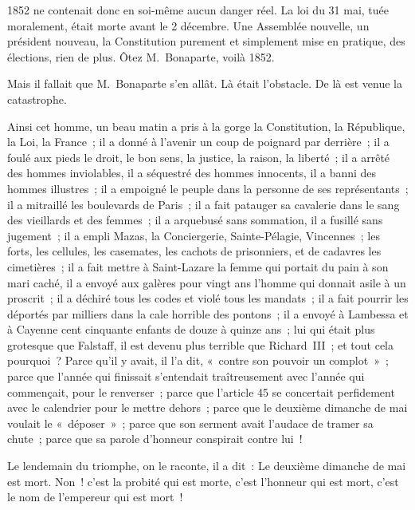 \documentclass[french,twoside]{book} %
\begin{document}
1852 ne contenait donc en soi-même aucun danger réel. La loi du 31 mai, tuée moralement, était morte avant le 2 décembre. Une Assemblée nouvelle, un président nouveau, la Constitution purement et simplement mise en pratique, des élections, rien de plus. Ôtez M. Bonaparte, voilà 1852.\par
Mais il fallait que M. Bonaparte s’en allât. Là était l’obstacle. De là est venue la catastrophe.\par
Ainsi cet homme, un beau matin a pris à la gorge la Constitution, la République, la Loi, la France ; il a donné à l’avenir un coup de poignard par derrière ; il a foulé aux pieds le droit, le bon sens, la justice, la raison, la liberté ; il a arrêté des hommes inviolables, il a séquestré des hommes innocents, il a banni des hommes illustres ; il a empoigné le peuple dans la personne de ses représentants ; il a mitraillé les boulevards de Paris ; il a fait patauger sa cavalerie dans le sang des vieillards et des femmes ; il a arquebusé sans sommation, il a fusillé sans jugement ; il a empli Mazas, la Conciergerie, Sainte-Pélagie, Vincennes ; les forts, les cellules, les casemates, les cachots de prisonniers, et de cadavres les cimetières ; il a fait mettre à Saint-Lazare la femme qui portait du pain à son mari caché, il a envoyé aux galères pour vingt ans l’homme qui donnait asile à un proscrit ; il a déchiré tous les codes et violé tous les mandats ; il a fait pourrir les déportés par milliers dans la cale horrible des pontons ; il a envoyé à Lambessa et à Cayenne cent cinquante enfants de douze à quinze ans ; lui qui était plus grotesque que Falstaff, il est devenu plus terrible que Richard III ; et tout cela pourquoi ? Parce qu’il y avait, il l’a dit, « contre son pouvoir un complot » ; parce que l’année qui finissait s’entendait traîtreusement avec l’année qui commençait, pour le renverser ; parce que l’article 45 se concertait perfidement avec le calendrier pour le mettre dehors ; parce que le deuxième dimanche de mai voulait le « déposer » ; parce que son serment avait l’audace de tramer sa chute ; parce que sa parole d’honneur conspirait contre lui !\par
Le lendemain du triomphe, on le raconte, il a dit : Le deuxième dimanche de mai est mort. Non ! c’est la probité qui est morte, c’est l’honneur qui est mort, c’est le nom de l’empereur qui est mort !\par
\end{document}
